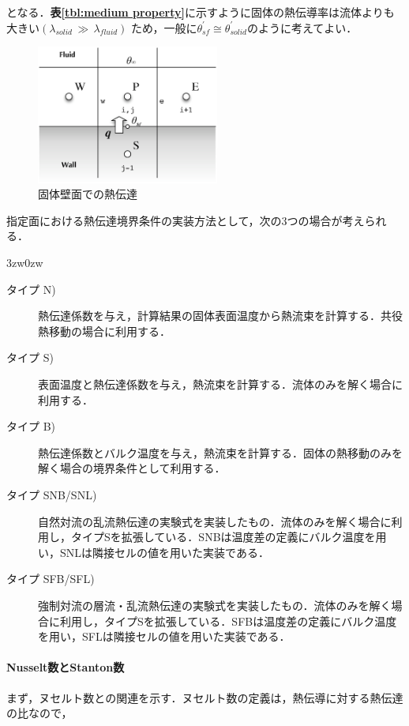 \noindent となる．\textbf{表\ref{tbl:medium property}}に示すように固体の熱伝導率は流体よりも大きい$( \lambda_{solid}\, \gg \, \lambda_{fluid} )$ ため，一般に$\theta_{sf}^{\prime} \cong \theta_{solid}^{\prime}$のように考えてよい．

\begin{figure}[htdp]
\begin{center}
\includegraphics[width=6cm,clip]{HeatTransfer.eps}
\caption{固体壁面での熱伝達}
\label{fig:heat transfer on solid}
\end{center}
\end{figure}

指定面における熱伝達境界条件の実装方法として，次の3つの場合が考えられる．
\begin{indentation}{3zw}{0zw}
\begin{description}
\item[タイプ N)] 熱伝達係数を与え，計算結果の固体表面温度から熱流束を計算する．共役熱移動の場合に利用する．
\item[タイプ S)] 表面温度と熱伝達係数を与え，熱流束を計算する．流体のみを解く場合に利用する．
\item[タイプ B)] 熱伝達係数とバルク温度を与え，熱流束を計算する．固体の熱移動のみを解く場合の境界条件として利用する．
\item[タイプ SNB/SNL)] 自然対流の乱流熱伝達の実験式を実装したもの．流体のみを解く場合に利用し，タイプSを拡張している．SNBは温度差の定義にバルク温度を用い，SNLは隣接セルの値を用いた実装である．
\item[タイプ SFB/SFL)] 強制対流の層流・乱流熱伝達の実験式を実装したもの．流体のみを解く場合に利用し，タイプSを拡張している．SFBは温度差の定義にバルク温度を用い，SFLは隣接セルの値を用いた実装である．
\end{description}
\end{indentation}

%
\paragraph{Nusselt数とStanton数}
まず，ヌセルト数との関連を示す．ヌセルト数の定義は，熱伝導に対する熱伝達の比なので，

